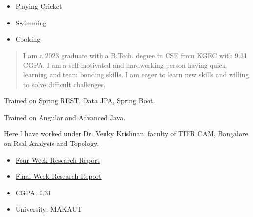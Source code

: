 \documentclass[10pt,legalpaper,ragged2e,withhyper]{altacv}
\newenvironment{sloppypar*}{\sloppy\ignorespaces}{\par}
\begin{document}
\begin{paracol}{2}
    \begin{sloppypar*}
        \begin{itemize}
            \item Playing Cricket
            \item Swimming
            \item Cooking
        \end{itemize}
    \end{sloppypar*}

    \newpage
    \switchcolumn

    \begin{quote}

        I am a 2023 graduate with a B.Tech. degree in CSE from KGEC with 9.31 CGPA. I am a self-motivated and hardworking person having quick learning and team bonding skills. I am eager to learn new skills and willing to solve difficult challenges.

    \end{quote}

    Trained on Spring REST, Data JPA, Spring Boot.
    \divider

    Trained on Angular and Advanced Java.
    \divider

    Here I have worked under Dr. Venky Krishnan, faculty of TIFR CAM, Bangalore on Real Analysis and Topology. \\
    \begin{itemize}
        \item \href{https://www.academia.edu/94639467/Four_Week_Research_Report_of_IASC_INSA_NASI_Summer_Research_Fellowship?source=swp_share}{Four Week Research Report}
        \item \href{https://www.academia.edu/94640080/Final_Week_Research_Report_of_IASC_INSA_NASI_Summer_Research_Fellowship?source=swp_share}{Final Week Research Report}
    \end{itemize}

    \begin{minipage}[t]{0.2\textwidth}
        \begin{itemize}
            \item CGPA: 9.31
        \end{itemize}
    \end{minipage}
    \begin{minipage}[t]{0.4\textwidth}
        \begin{itemize}
            \item University: MAKAUT
        \end{itemize}
    \end{minipage}
    \divider


\end{paracol}
\end{document}
